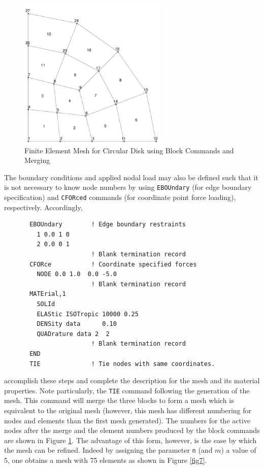 \begin{figure}[ht!]
\centerline {\hfil \includegraphics[width=2.8in]{figs/fig3} \hfil}
\caption{Finite Element Mesh for Circular Disk using Block Commands and Merging}
\label{fig6}
\end{figure}

The boundary conditions and applied nodal load may also be defined such that
it is not necessary to know node numbers by using {\tt EBOUndary} (for
edge boundary specification) and {\tt CFORced} commands
(for coordinate point force loading), respectively.  Accordingly,
\begin{verbatim}
       EBOUndary        ! Edge boundary restraints
         1 0.0 1 0
         2 0.0 0 1
                        ! Blank termination record
       CFORce           ! Coordinate specified forces
         NODE 0.0 1.0  0.0 -5.0
                        ! Blank termination record
       MATErial,1
         SOLId
         ELAStic ISOTropic 10000 0.25
         DENSity data      0.10
         QUADrature data 2  2
                        ! Blank termination record
       END
       TIE              ! Tie nodes with same coordinates.
\end{verbatim}
accomplish these steps and complete the description for the mesh
and its material properties.
Note particularly, the {\tt TIE} command following the generation of
the mesh.  This command will merge the three blocks to form a
mesh which is equivalent to the original mesh (however, this mesh has
different numbering for nodes and elements than the first mesh generated).
The numbers for the active nodes after the merge and the element numbers
produced by the block commands are shown in Figure \ref{fig6}.
The advantage of this form, however, is the ease by which the mesh
can be refined.  Indeed by assigning the parameter {\tt n} (and $m$) a value
of 5, one obtains a mesh with 75 elements as shown in Figure \ref{fig7}.

